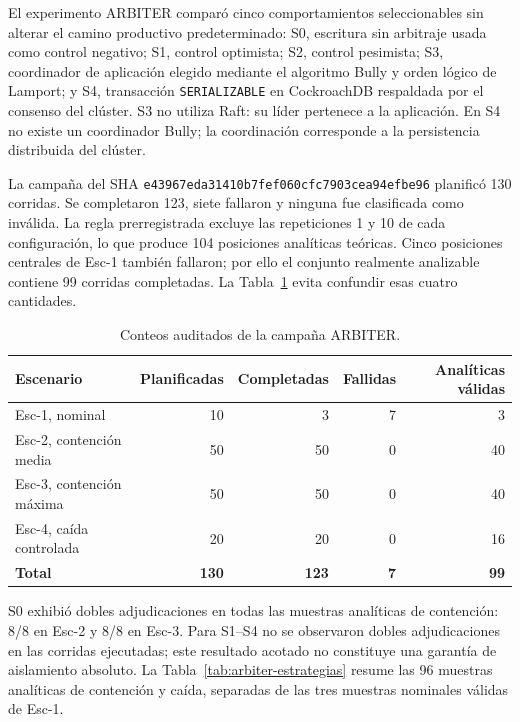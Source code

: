 El experimento ARBITER comparó cinco comportamientos seleccionables sin alterar
el camino productivo predeterminado: S0, escritura sin arbitraje usada como
control negativo; S1, control optimista; S2, control pesimista; S3, coordinador
de aplicación elegido mediante el algoritmo Bully y orden lógico de Lamport; y
S4, transacción \texttt{SERIALIZABLE} en CockroachDB respaldada por el consenso
del clúster. S3 no utiliza Raft: su líder pertenece a la aplicación. En S4 no
existe un coordinador Bully; la coordinación corresponde a la persistencia
distribuida del clúster.

La campaña del SHA
\texttt{e43967eda31410b7fef060cfc7903cea94efbe96} planificó 130 corridas. Se
completaron 123, siete fallaron y ninguna fue clasificada como inválida. La regla
prerregistrada excluye las repeticiones 1 y 10 de cada configuración, lo que
produce 104 posiciones analíticas teóricas. Cinco posiciones centrales de
Esc-1 también fallaron; por ello el conjunto realmente analizable contiene 99
corridas completadas. La Tabla~\ref{tab:arbiter-conteos} evita confundir esas
cuatro cantidades.

\begin{table}[ht]
  \centering
  \small
  \caption{Conteos auditados de la campaña ARBITER.}
  \label{tab:arbiter-conteos}
  \begin{tabular}{|l|r|r|r|r|}
    \hline
    \textbf{Escenario} & \textbf{Planificadas} & \textbf{Completadas} & \textbf{Fallidas} & \textbf{Analíticas válidas} \\
    \hline
    Esc-1, nominal & 10 & 3 & 7 & 3 \\
    \hline
    Esc-2, contención media & 50 & 50 & 0 & 40 \\
    \hline
    Esc-3, contención máxima & 50 & 50 & 0 & 40 \\
    \hline
    Esc-4, caída controlada & 20 & 20 & 0 & 16 \\
    \hline
    \textbf{Total} & \textbf{130} & \textbf{123} & \textbf{7} & \textbf{99} \\
    \hline
  \end{tabular}
\end{table}

S0 exhibió dobles adjudicaciones en todas las muestras analíticas de
contención: 8/8 en Esc-2 y 8/8 en Esc-3. Para S1--S4 no se observaron dobles
adjudicaciones en las corridas ejecutadas; este resultado acotado no constituye
una garantía de aislamiento absoluto. La Tabla~\ref{tab:arbiter-estrategias}
resume las 96 muestras analíticas de contención y caída, separadas de las tres
muestras nominales válidas de Esc-1.

